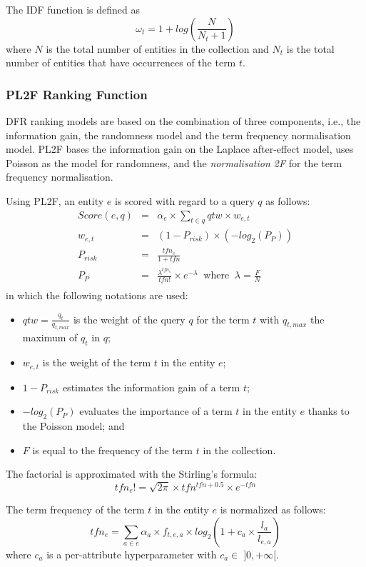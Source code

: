 The IDF function is defined as
$$
\omega_t=1+log\left(\frac{N}{N_t+1}\right)
$$
where $N$ is the total number of entities in the collection and $N_t$ is the total number of entities that have occurrences of the term $t$.

\subsubsection{PL2F Ranking Function}

DFR ranking models are based on the combination of three components, i.e., the information gain, the randomness model and the term frequency normalisation model. PL2F bases the information gain on the Laplace after-effect model, uses Poisson as the model for randomness, and the \emph{normalisation 2F} for the term frequency normalisation.

Using PL2F, an entity $e$ is scored with regard to a query $q$ as follows:
\begin{eqnarray*}
	Score(e,q) & = & \alpha_e\times\sum_{t\in q}{qtw \times w_{e,t}}\\
	\label{eq:dfr-score}
	w_{e,t} & = & \left(1-P_{risk}\right) \times \left(-log_2\left(P_{P}\right)\right) \\
	\label{eq:dfr-term-weight}
	P_{risk} & = & \frac{tfn_e}{1+tfn} \\
	\label{eq:dfr-prisk}
	P_{P} & = & \frac{\lambda^{tfn_e}}{tfn!}\times e^{-\lambda} \:\text{ where }\: \lambda=\frac{F}{N} \\
	\label{eq:dfr:rand-poisson}
\end{eqnarray*}
in which the following notations are used:
\begin{itemize}
	\item $qtw=\frac{q_t}{q_{t,max}}$ is the weight of the query $q$ for the term $t$ with $q_{t,max}$ the maximum of $q_t$ in $q$;
	\item $w_{e,t}$ is the weight of the term $t$ in the entity $e$;
	\item $1-P_{risk}$ estimates the information gain of a term $t$;
	\item $-log_2\left(P_{P}\right)$ evaluates the importance of a term $t$ in the entity $e$ thanks to the Poisson model; and
	\item $F$ is equal to the frequency of the term $t$ in the collection.
\end{itemize}

The factorial is approximated with the Stirling's formula:
$$
tfn_e!=\sqrt{2\pi}\times tfn^{tfn+0.5}\times e^{-tfn}
$$

The term frequency of the term $t$ in the entity $e$ is normalized as follows:
\begin{equation}
tfn_e = \sum_{a\in e}{\alpha_a\times f_{t,e,a} \times log_2\left(1+c_a\times\frac{l_a}{l_{e,a}}\right)}
\label{eq:pl2f}
\end{equation}
where $c_a$ is a per-attribute hyperparameter with $c_a \in\;]0,+\infty[$.
